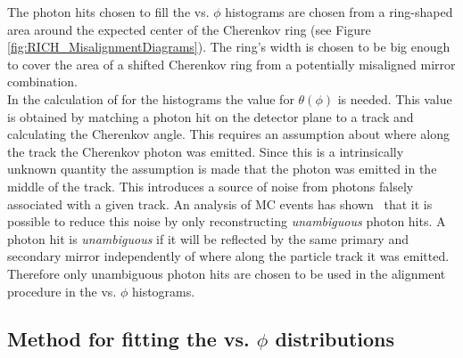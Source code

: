 The photon hits chosen to fill the \deltatheta vs. $\phi$ histograms are chosen from a ring-shaped area around the expected center of the Cherenkov ring (see Figure \ref{fig:RICH_MisalignmentDiagrams}). The ring's width is chosen to be big enough to cover the area of a shifted Cherenkov ring from a potentially misaligned mirror combination.\\
In the calculation of \deltatheta for the histograms the value for $\theta\left(\phi\right)$ is needed. This value is obtained by matching a photon hit on the detector plane to a track and calculating the Cherenkov angle. This requires an assumption about where along the track the Cherenkov photon was emitted. Since this is a intrinsically unknown quantity the assumption is made that the photon was emitted in the middle of the track. This introduces a source of noise from photons falsely associated with a given track. An analysis of MC events has shown~\cite{Gorisek:1999td} that it is possible to reduce this noise by only reconstructing \textit{unambiguous} photon hits. A photon hit is \textit{unambiguous} if it will be reflected by the same primary and secondary mirror independently of where along the particle track it was emitted. Therefore only unambiguous photon hits are chosen to be used in the alignment procedure in the \deltatheta vs. $\phi$ histograms.\\


\subsection{Method for fitting the \deltatheta vs. $\phi$ distributions}
\label{subsec:Fitting}

